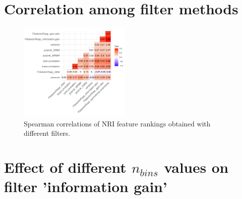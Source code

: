 \documentclass[letterpaper, peerreview, draftcls]{IEEEtran}
\begin{document}


\pagebreak
\section{Correlation among filter methods}

\begin{figure} [ht]
	\begin{center}
		\includegraphics[width=0.48\textwidth] {correlation-filter-nri-1.pdf}
		\caption{Spearman correlations of NRI feature rankings obtained with different filters.}\label{fig:correlation-filters}
	\end{center}
\end{figure}

\section{Effect of different \texorpdfstring{\(n_{bins}\)}{nbins} values on filter 'information gain'}
\end{document}
